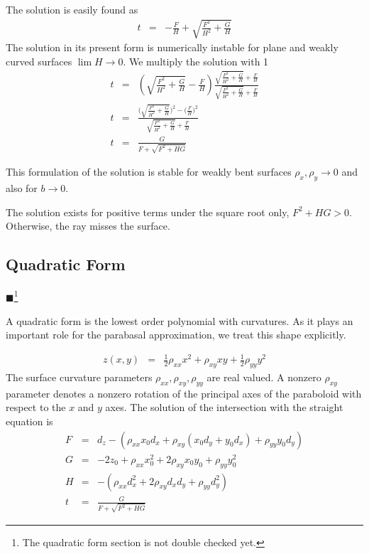 \documentclass[12pt,a4paper,twoside,openright,BCOR10mm,headsepline,titlepage,abstracton,chapterprefix,final]{scrreprt}
\newcommand{\remark}[1]{{\color{red}$\blacksquare$}\footnote{{\color{red}#1}}}
\begin{document}
The solution is easily found as
\begin{eqnarray}
  t &=& - \frac{F}{H} + \sqrt{\frac{F^2}{H^2} + \frac{G}{H}}
\end{eqnarray}
The solution in its present form is numerically instable for plane and weakly curved surfaces $\lim H \rightarrow 0$.
We multiply the solution with 1
\begin{eqnarray}
  t &=&  \left( \sqrt{\frac{F^2}{H^2} + \frac{G}{H}} - \frac{F}{H} \right) \frac{\sqrt{\frac{F^2}{H^2} + \frac{G}{H}} + \frac{F}{H}}{\sqrt{\frac{F^2}{H^2} + \frac{G}{H}} + \frac{F}{H}} \\
  t &=&  \frac{ \bigg( \sqrt{\frac{F^2}{H^2} + \frac{G}{H}} \bigg)^2 - \bigg( \frac{F}{H} \bigg)^2 }{\sqrt{\frac{F^2}{H^2} + \frac{G}{H}} + \frac{F}{H}} \\
  t &=& \frac{G}{ F + \sqrt{F^2 + H G} }
\end{eqnarray}

This formulation of the solution is stable for weakly bent surfaces $\rho_x, \rho_y \rightarrow 0$ and also for $b \rightarrow 0$.

The solution exists for positive terms under the square root only, $F^2 + H G > 0$. 
Otherwise, the ray misses the surface.


\subsection{Quadratic Form}
\remark{The quadratic form section is not double checked yet.}

A quadratic form is the lowest order polynomial with curvatures.
As it plays an important role for the parabasal approximation, we treat this shape explicitly.


\begin{eqnarray}
 z(x,y) &=& \frac{1}{2} \rho_{xx} x^2 + \rho_{xy} x y + \frac{1}{2} \rho_{yy} y^2
 \label{eq:quadratic_form_sag}
\end{eqnarray}
The surface curvature parameters $\rho_{xx},\rho_{xy},\rho_{yy}$ are real valued. 
A nonzero $\rho_{xy}$ parameter denotes a nonzero rotation of the principal axes of the paraboloid with respect to the $x$ and $y$ axes.
The solution of the intersection with the straight equation is
\begin{eqnarray}
 F &=& d_z - \left( \rho_{xx} x_0 d_x + \rho_{xy} \left( x_0 d_y + y_0 d_x \right)  + \rho_{yy} y_0 d_y \right)   \\
 G &=& - 2 z_0 + \rho_{xx} x_0^2 + 2 \rho_{xy} x_0 y_0 + \rho_{yy} y_0^2 \\
 H &=& - \left( \rho_{xx} d_x^2 +  2 \rho_{xy} d_x d_y + \rho_{yy} d_y^2 \right) \\
 t &=& \frac{G}{ F + \sqrt{F^2 + H G} }
 \label{eq:quadratic_form_t}
\end{eqnarray}
\end{document}
